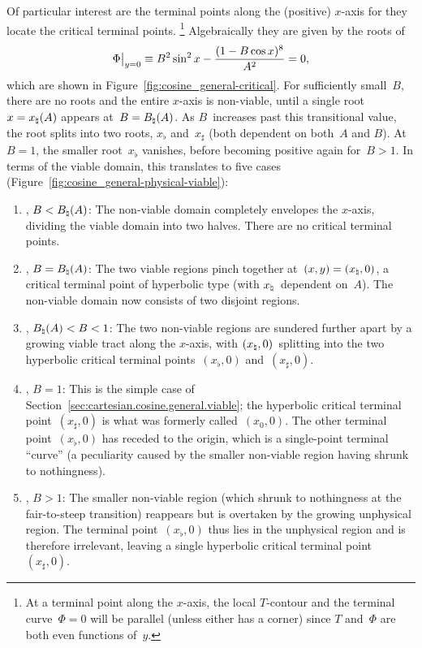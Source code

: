 Of particular interest are the terminal points along the (positive) $x$-axis
for they locate the critical terminal points.%
\footnote{
  At a terminal point along the $x$-axis,
  the local $T$-contour and the terminal curve~$\Phi = 0$
  will be parallel (unless either has a corner)
  since $T$ and~$\Phi$ are both even functions of~$y$.
}
Algebraically they are given by the roots of
\begin{equation}
  \eval[\big]{\Phi}_{y=0}
  \ideq B^2 \sin^2 x - \frac{(1 - B \cos x)^8}{A^2}
  = 0,
  \label{eq:cosine-general-critical-terminal-point-x}
\end{equation}
which are shown in Figure~\ref{fig:cosine_general-critical}.
For sufficiently small~$B$,
there are no roots and the entire $x$-axis is non-viable,
until a single root~$x = x_\natural (A)$ appears at~$B = B_\natural (A)$.
As $B$~increases past this transitional value,
the root splits into two roots, $x_\flat$ and~$x_\sharp$
(both dependent on both~$A$ and $B$).
At~$B = 1$, the smaller root~$x_\flat$ vanishes,
before becoming positive again for~$B > 1$.
In terms of the viable domain, this translates to five cases
(Figure~\ref{fig:cosine_general-physical-viable}):
\begin{enumerate}
  \item
    , $B < B_\natural (A)$:
    The non-viable domain completely envelopes the $x$-axis,
    dividing the viable domain into two halves.
    There are no critical terminal points.
  \item
    , $B = B_\natural (A)$:
    The two viable regions pinch together at~$(x, y) = (x_\natural, 0)$,
    a critical terminal point of hyperbolic type
    (with $x_\natural$~dependent on~$A$).
    The non-viable domain now consists of two disjoint regions.
  \item
    , $B_\natural (A) < B < 1$:
    The two non-viable regions are sundered further apart
    by a growing viable tract along the $x$-axis,
    with $(x_\natural, 0)$~splitting into the two
    hyperbolic critical terminal points~$(x_\flat, 0)$ and~$(x_\sharp, 0)$.
  \item
    , $B = 1$:
    This is the simple case
    of Section~\ref{sec:cartesian.cosine.general.viable};
    the hyperbolic critical terminal point~$(x_\sharp, 0)$
    is what was formerly called~$(x_0, 0)$.
    The other terminal point~$(x_\flat, 0)$ has receded to the origin,
    which is a single-point terminal ``curve''
    (a peculiarity caused by the smaller non-viable region
    having shrunk to nothingness).
  \item
    , $B > 1$:
    The smaller non-viable region
    (which shrunk to nothingness at the fair-to-steep transition)
    reappears but is overtaken by the growing unphysical region.
    The terminal point~$(x_\flat, 0)$ thus lies in the unphysical region
    and is therefore irrelevant,
    leaving a single hyperbolic critical terminal point~$(x_\sharp, 0)$.
\end{enumerate}

